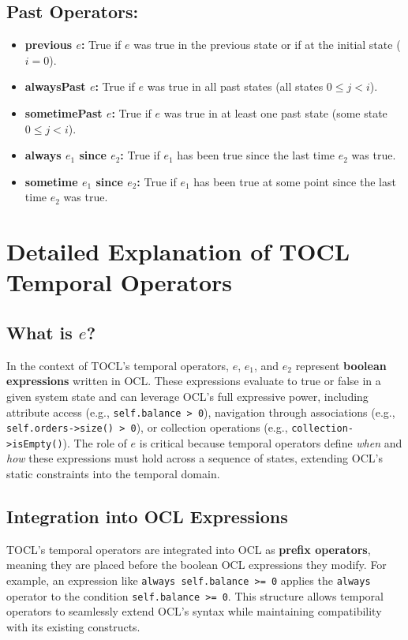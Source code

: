 \subsection*{Past Operators:}
\begin{itemize}
    \item \textbf{previous $e$:} True if $e$ was true in the previous state or if at the initial state ($i = 0$).
    \item \textbf{alwaysPast $e$:} True if $e$ was true in all past states (all states $0 \leq j < i$).
    \item \textbf{sometimePast $e$:} True if $e$ was true in at least one past state (some state $0 \leq j < i$).
    \item \textbf{always $e_1$ since $e_2$:} True if $e_1$ has been true since the last time $e_2$ was true.
    \item \textbf{sometime $e_1$ since $e_2$:} True if $e_1$ has been true at some point since the last time $e_2$ was true.
\end{itemize}

\section*{Detailed Explanation of TOCL Temporal Operators}

\subsection*{What is $e$?}
In the context of TOCL’s temporal operators, $e$, $e_1$, and $e_2$ represent \textbf{boolean expressions} written in OCL. These expressions evaluate to true or false in a given system state and can leverage OCL’s full expressive power, including attribute access (e.g., \texttt{self.balance > 0}), navigation through associations (e.g., \texttt{self.orders->size() > 0}), or collection operations (e.g., \texttt{collection->isEmpty()}). The role of $e$ is critical because temporal operators define \textit{when} and \textit{how} these expressions must hold across a sequence of states, extending OCL’s static constraints into the temporal domain.

\subsection*{Integration into OCL Expressions}
TOCL’s temporal operators are integrated into OCL as \textbf{prefix operators}, meaning they are placed before the boolean OCL expressions they modify. For example, an expression like \texttt{always self.balance >= 0} applies the \texttt{always} operator to the condition \texttt{self.balance >= 0}. This structure allows temporal operators to seamlessly extend OCL’s syntax while maintaining compatibility with its existing constructs.

